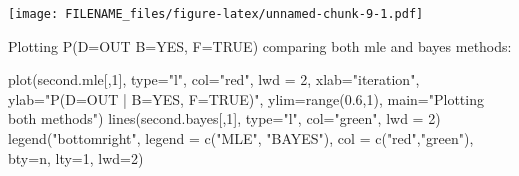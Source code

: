 \documentclass[
]{article}
\newenvironment{Shaded}{\begin{snugshade}}{\end{snugshade}}
\newcommand{\AttributeTok}[1]{\textcolor[rgb]{0.77,0.63,0.00}{#1}}
\newcommand{\CommentTok}[1]{\textcolor[rgb]{0.56,0.35,0.01}{\textit{#1}}}
\newcommand{\DecValTok}[1]{\textcolor[rgb]{0.00,0.00,0.81}{#1}}
\newcommand{\FloatTok}[1]{\textcolor[rgb]{0.00,0.00,0.81}{#1}}
\newcommand{\FunctionTok}[1]{\textcolor[rgb]{0.00,0.00,0.00}{#1}}
\newcommand{\NormalTok}[1]{#1}
\newcommand{\OtherTok}[1]{\textcolor[rgb]{0.56,0.35,0.01}{#1}}
\newcommand{\SpecialCharTok}[1]{\textcolor[rgb]{0.00,0.00,0.00}{#1}}
\newcommand{\StringTok}[1]{\textcolor[rgb]{0.31,0.60,0.02}{#1}}
\begin{document}
\begin{Shaded}
\end{Shaded}

\texttt{[image: FILENAME\_files/figure-latex/unnamed-chunk-9-1.pdf]}

Plotting P(D=OUT \textbar{} B=YES, F=TRUE) comparing both mle and bayes methods:

\begin{Shaded}
\begin{Highlighting}[]
\FunctionTok{plot}\NormalTok{(second.mle[,}\DecValTok{1}\NormalTok{], }\AttributeTok{type=}\StringTok{"l"}\NormalTok{, }\AttributeTok{col=}\StringTok{"red"}\NormalTok{, }\AttributeTok{lwd =} \DecValTok{2}\NormalTok{, }\AttributeTok{xlab=}\StringTok{"iteration"}\NormalTok{, }\AttributeTok{ylab=}\StringTok{"P(D=OUT | B=YES, F=TRUE)"}\NormalTok{, }\AttributeTok{ylim=}\FunctionTok{range}\NormalTok{(}\FloatTok{0.6}\NormalTok{,}\DecValTok{1}\NormalTok{), }\AttributeTok{main=}\StringTok{"Plotting both methods"}\NormalTok{)}
\FunctionTok{lines}\NormalTok{(second.bayes[,}\DecValTok{1}\NormalTok{], }\AttributeTok{type=}\StringTok{"l"}\NormalTok{, }\AttributeTok{col=}\StringTok{"green"}\NormalTok{, }\AttributeTok{lwd =} \DecValTok{2}\NormalTok{)}
\FunctionTok{legend}\NormalTok{(}\StringTok{"bottomright"}\NormalTok{, }\AttributeTok{legend =} \FunctionTok{c}\NormalTok{(}\StringTok{"MLE"}\NormalTok{, }\StringTok{"BAYES"}\NormalTok{), }\AttributeTok{col =} \FunctionTok{c}\NormalTok{(}\StringTok{"red"}\NormalTok{,}\StringTok{"green"}\NormalTok{), }\AttributeTok{bty=}\StringTok{\textquotesingle{}n\textquotesingle{}}\NormalTok{, }\AttributeTok{lty=}\DecValTok{1}\NormalTok{, }\AttributeTok{lwd=}\DecValTok{2}\NormalTok{)}
\end{Highlighting}
\end{Shaded}
\end{document}
